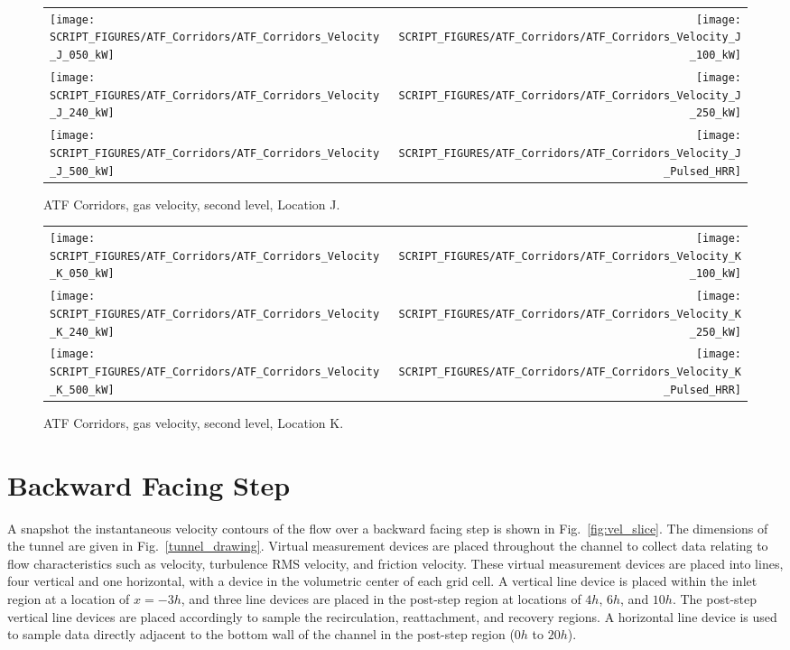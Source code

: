 \begin{figure}[p]
\begin{tabular*}{\textwidth}{l@{\extracolsep{\fill}}r}
\texttt{[image: SCRIPT\_FIGURES/ATF\_Corridors/ATF\_Corridors\_Velocity\_J\_050\_kW]} &
\texttt{[image: SCRIPT\_FIGURES/ATF\_Corridors/ATF\_Corridors\_Velocity\_J\_100\_kW]} \\
\texttt{[image: SCRIPT\_FIGURES/ATF\_Corridors/ATF\_Corridors\_Velocity\_J\_240\_kW]} &
\texttt{[image: SCRIPT\_FIGURES/ATF\_Corridors/ATF\_Corridors\_Velocity\_J\_250\_kW]} \\
\texttt{[image: SCRIPT\_FIGURES/ATF\_Corridors/ATF\_Corridors\_Velocity\_J\_500\_kW]} &
\texttt{[image: SCRIPT\_FIGURES/ATF\_Corridors/ATF\_Corridors\_Velocity\_J\_Pulsed\_HRR]}
\end{tabular*}
\caption{ATF Corridors, gas velocity, second level, Location J.}
\label{ATF_Velocity_J}
\end{figure}

\begin{figure}[p]
\begin{tabular*}{\textwidth}{l@{\extracolsep{\fill}}r}
\texttt{[image: SCRIPT\_FIGURES/ATF\_Corridors/ATF\_Corridors\_Velocity\_K\_050\_kW]} &
\texttt{[image: SCRIPT\_FIGURES/ATF\_Corridors/ATF\_Corridors\_Velocity\_K\_100\_kW]} \\
\texttt{[image: SCRIPT\_FIGURES/ATF\_Corridors/ATF\_Corridors\_Velocity\_K\_240\_kW]} &
\texttt{[image: SCRIPT\_FIGURES/ATF\_Corridors/ATF\_Corridors\_Velocity\_K\_250\_kW]} \\
\texttt{[image: SCRIPT\_FIGURES/ATF\_Corridors/ATF\_Corridors\_Velocity\_K\_500\_kW]} &
\texttt{[image: SCRIPT\_FIGURES/ATF\_Corridors/ATF\_Corridors\_Velocity\_K\_Pulsed\_HRR]}
\end{tabular*}
\caption{ATF Corridors, gas velocity, second level, Location K.}
\label{ATF_Velocity_K}
\end{figure}


\clearpage

\section{Backward Facing Step}

A snapshot the instantaneous velocity contours of the flow over a backward facing step is shown in Fig.~\ref{fig:vel_slice}. The dimensions of the tunnel are given in Fig.~\ref{tunnel_drawing}. Virtual measurement devices are placed throughout the channel to collect data relating to flow characteristics such as velocity, turbulence RMS velocity, and friction velocity.  These virtual measurement devices are placed into lines, four vertical and one horizontal, with a device in the volumetric center of each grid cell.  A vertical line device is placed within the inlet region at a location of $x=-3h$, and three line devices are placed in the post-step region at locations of $4h$, $6h$, and $10h$. The post-step vertical line devices are placed accordingly to sample the recirculation, reattachment, and recovery regions.  A horizontal line device is used to sample data directly adjacent to the bottom wall of the channel in the post-step region ($0h$ to $20h$).

